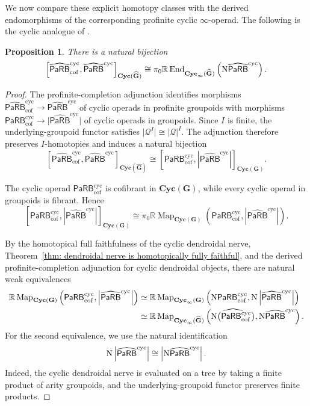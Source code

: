 \documentclass{amsart}
\newcommand{\calQ}{\mathcal{Q}}
\newcommand{\Grpd}{\mathbf{G}}
\newcommand{\PaRB}{\mathsf{PaRB}}
\newcommand{\Cyc}{\mathbf{Cyc}}
\newcommand{\End}{\operatorname{End}}
\newcommand{\Map}{\operatorname{Map}}
\newcommand{\nerve}{\textnormal{N}}
\newtheorem{prop}[theorem]{Proposition}%
\theoremstyle{definition}
\numberwithin{equation}{section}
\begin{document}
We now compare these explicit homotopy classes with the derived
endomorphisms of the corresponding profinite cyclic
$\infty$-operad. The following is the cyclic analogue of
\cite[Proposition~8.2]{Boavida-Horel-Robertson}.


\begin{prop}
\label{prop: strict and derived cyclic endomorphisms PaRB}
There is a natural bijection
\[
\left[\widehat{\PaRB}_{\mathrm{cof}}^{\mathrm{cyc}},\widehat{\PaRB}^{\mathrm{cyc}}\right]_{\Cyc(\widehat{\Grpd})}\cong\pi_0\mathbb R\End_{\Cyc_\infty(\widehat{\Grpd})}\left(\nerve\widehat{\PaRB}^{\mathrm{cyc}}\right).
\]
\end{prop}

\begin{proof}
The profinite-completion adjunction identifies morphisms $\widehat{\PaRB}_{\mathrm{cof}}^{\mathrm{cyc}} \to\widehat{\PaRB}^{\mathrm{cyc}}$ of cyclic operads in profinite groupoids with morphisms $\PaRB_{\mathrm{cof}}^{\mathrm{cyc}}\to\lvert\widehat{\PaRB}^{\mathrm{cyc}}\rvert$ of cyclic operads in groupoids. Since $I$ is finite, the underlying-groupoid functor satisfies $\lvert\calQ^I\rvert\cong\lvert\calQ\rvert^I$. The adjunction therefore preserves $I$-homotopies and induces a natural bijection
\[
\left[\widehat{\PaRB}_{\mathrm{cof}}^{\mathrm{cyc}},\widehat{\PaRB}^{\mathrm{cyc}}\right]_{\Cyc(\widehat{\Grpd})}\cong\left[\PaRB_{\mathrm{cof}}^{\mathrm{cyc}},\left|\widehat{\PaRB}^{\mathrm{cyc}}\right|\right]_{\Cyc(\Grpd)}.
\]

The cyclic operad $\PaRB_{\mathrm{cof}}^{\mathrm{cyc}}$ is cofibrant in $\Cyc(\Grpd)$, while every cyclic operad in groupoids is fibrant. Hence
\[
\left[\PaRB_{\mathrm{cof}}^{\mathrm{cyc}},\left|\widehat{\PaRB}^{\mathrm{cyc}}\right|\right]_{\Cyc(\Grpd)}
\cong
\pi_0\mathbb R\Map_{\Cyc(\Grpd)}\left(\PaRB_{\mathrm{cof}}^{\mathrm{cyc}},\left|\widehat{\PaRB}^{\mathrm{cyc}}\right|\right).
\]

By the homotopical full faithfulness of the cyclic dendroidal nerve, Theorem~\ref{thm: dendroidal nerve is homotopically fully faithful}, and the derived profinite-completion adjunction for cyclic dendroidal objects, there are natural weak equivalences
\[
\begin{aligned}
\mathbb R\Map_{\Cyc(\Grpd)}\left(\PaRB_{\mathrm{cof}}^{\mathrm{cyc}},\left|\widehat{\PaRB}^{\mathrm{cyc}}\right|\right)
&\simeq
\mathbb R\Map_{\Cyc_\infty(\Grpd)}
\left(
\nerve\PaRB_{\mathrm{cof}}^{\mathrm{cyc}},
\nerve\left|\widehat{\PaRB}^{\mathrm{cyc}}\right|
\right)
\\
&\simeq
\mathbb R\Map_{\Cyc_\infty(\widehat{\Grpd})}
\left(
\widehat{\nerve\bigl(
\PaRB_{\mathrm{cof}}^{\mathrm{cyc}}
\bigr)},
\nerve\widehat{\PaRB}^{\mathrm{cyc}}
\right).
\end{aligned}
\]
For the second equivalence, we use the natural identification
\[
\nerve\left|\widehat{\PaRB}^{\mathrm{cyc}}\right|
\cong
\left|\nerve\widehat{\PaRB}^{\mathrm{cyc}}\right|.
\]
Indeed, the cyclic dendroidal nerve is evaluated on a tree by taking
a finite product of arity groupoids, and the underlying-groupoid
functor preserves finite products.


\end{proof}
\end{document}
